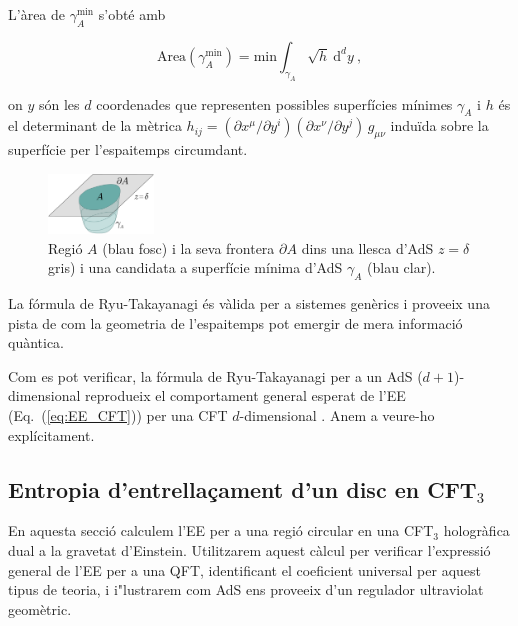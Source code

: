 \documentclass[twocolumn]{revtex4}
\providecommand{\eq}[2]{
    \begin{equation}
        #2
    \label{eq:#1}
    \end{equation}
}
\begin{document}
L'àrea de $\gamma_A^\text{min}$ s'obté amb
\eq{EE_RT-area}{
\text{Area}(\gamma_A^\text{min}) ={\text{min}} \int_{\gamma_A} \sqrt{h} \ \mathrm{d}^{d}y \ ,
}
on $y$ són les $d$ coordenades que representen possibles superfícies mínimes $\gamma_A$ i $h$ és el determinant de la mètrica $h_{ij} = (\partial x^\mu / \partial y^i) (\partial x^\nu / \partial y^j) \, g_{\mu\nu}$ induïda sobre la superfície per l'espaitemps circumdant.

\begin{figure}
\centering
\includegraphics[width=0.25\textwidth]{../../Imatges/EE_AdS-CFT-D.png}
\caption{Regió $A$ (blau fosc) i la seva frontera $\partial A$ dins una llesca d'AdS $z=\delta$ gris) i una candidata a superfície mínima d'AdS $\gamma_A$ (blau clar).}
\label{fig:EE_AdS-CFT}
\end{figure}

La fórmula de Ryu-Takayanagi és vàlida per a sistemes genèrics i proveeix una pista de com la geometria de l'espaitemps pot emergir de mera informació quàntica.

Com es pot verificar, la fórmula de Ryu-Takayanagi per a un AdS ($d+1$)-dimensional reprodueix el comportament general esperat de l'EE (Eq.~(\ref{eq:EE_CFT})) per una CFT $d$-dimensional \cite{ryu_aspects_2006, nishioka_holographic_2009}. Anem a veure-ho explícitament.


\subsection{Entropia d'entrellaçament d'un disc en CFT\texorpdfstring{$_3$}{3}} \label{ss:EE-disk}

En aquesta secció calculem l'EE per a una regió circular en una CFT$_3$ hologràfica dual a la gravetat d'Einstein. Utilitzarem aquest càlcul per verificar l'expressió general de l'EE per a una QFT, identificant el coeficient universal per aquest tipus de teoria, i i"lustrarem com AdS ens proveeix d'un regulador ultraviolat geomètric.
\end{document}
